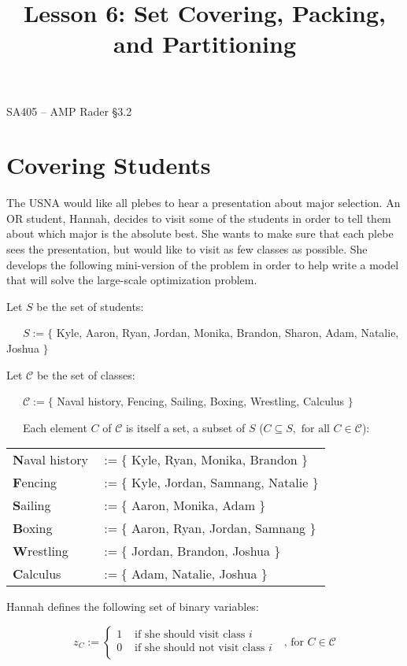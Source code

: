 \documentclass[11pt]{article}
\makeatletter
\theoremstyle{definition}
\renewcommand{\maketitle}{
  \noindent SA405 -- AMP \hfill Rader \S 3.2 \\

  \begin{center}\Large{\textbf{\@title}}\end{center}
}
\makeatother
\begin{document}
  
\title{Lesson 6: Set Covering, Packing, and Partitioning}

\maketitle


\section{Covering Students}
The USNA would like all plebes to hear a presentation about major selection. An OR student, Hannah, decides to visit some of the students in order to tell them about which major is the absolute best. She wants to make sure that each plebe sees the presentation, but would like to visit as few classes as possible.  She develops the following mini-version of the problem in order to help write a model that will solve the large-scale optimization problem.

Let $S$ be the set of students:

~~~$S := \{$ Kyle, Aaron, Ryan, Jordan, Monika, Brandon, Sharon, Adam, Natalie, Joshua $\}$

Let $\mathscr{C}$ be the set of classes:

~~~$\mathscr{C} := \{$ Naval history, Fencing, Sailing, Boxing, Wrestling, Calculus $\}$

~~~Each element $C$ of $\mathscr{C}$ is itself a set, a subset of $S$ ($C \subseteq S, \text{ for all } C \in \mathscr{C}$):
\begin{center}
\begin{tabular}{ll}
{\bf N}aval history &$:= \{$ Kyle, Ryan, Monika, Brandon $\}$\\
{\bf F}encing &$:= \{$ Kyle, Jordan, Samnang, Natalie $\}$\\
{\bf S}ailing &$:= \{$ Aaron, Monika, Adam $\}$\\
{\bf B}oxing &$:= \{$ Aaron, Ryan, Jordan, Samnang $\}$\\
{\bf W}restling &$:= \{$ Jordan, Brandon, Joshua $\}$\\
{\bf C}alculus &$:= \{$ Adam, Natalie, Joshua $\}$\\
\end{tabular}
\end{center}

\bigskip
Hannah defines the following set of binary variables:

\[
z_C := \left\{ \begin{array}{ll}
1 & \text{ if she should visit class $i$ } \\
0 & \text{ if she should not visit class $i$ } \\
\end{array} \right. \text{, for $C \in \mathscr{C}$}
\]
\end{document}
